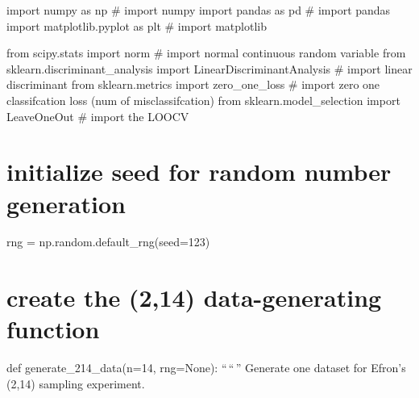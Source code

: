 \documentclass[
  letterpaper,
  DIV=11,
  numbers=noendperiod]{scrreprt}
\begin{document}
import numpy as np \# import numpy import pandas as pd \# import pandas
import matplotlib.pyplot as plt \# import matplotlib

from scipy.stats import norm \# import normal continuous random variable
from sklearn.discriminant\_analysis import LinearDiscriminantAnalysis \#
import linear discriminant from sklearn.metrics import zero\_one\_loss
\# import zero one classifcation loss (num of misclassifcation) from
sklearn.model\_selection import LeaveOneOut \# import the LOOCV


\chapter{initialize seed for random number
generation}\label{initialize-seed-for-random-number-generation}

rng = np.random.default\_rng(seed=123)


\chapter{create the (2,14) data-generating
function}\label{create-the-214-data-generating-function}

def generate\_214\_data(n=14, rng=None): ``\,``\,'' Generate one dataset
for Efron's (2,14) sampling experiment.
\end{document}
